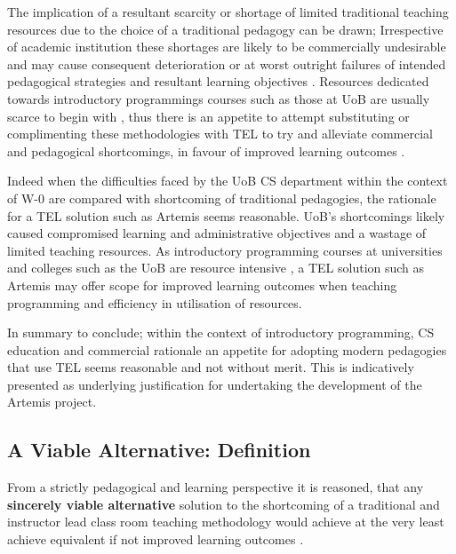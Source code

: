 The implication of a resultant scarcity or shortage  of limited traditional teaching resources due to the choice of a traditional pedagogy can be drawn; Irrespective of academic institution these shortages are likely to be commercially undesirable and may cause consequent deterioration or at worst outright failures of intended pedagogical strategies and resultant learning objectives \cite{Gordon2014,CinYeeHoo,Stuart2014}. Resources dedicated towards introductory programmings courses such as those at UoB are usually scarce to begin with \cite{Chigona2008}, thus there is an appetite to attempt substituting or complimenting these methodologies with TEL to try and alleviate commercial and pedagogical shortcomings, in favour of improved learning outcomes \cite{Chigona2008,Hackelbusch2007,Serrano-Laguna2015,Bittencourt2015,RickReis,Chat2014}.

Indeed when the difficulties faced by the UoB CS department within the context of W-0 are compared with shortcoming of traditional pedagogies, the rationale for a TEL solution such as Artemis seems reasonable. UoB's shortcomings likely caused compromised learning and administrative objectives and a wastage of limited teaching resources. As introductory programming courses at universities and colleges such as the UoB are resource intensive \cite{Chigona2008}, a TEL solution such as Artemis may offer scope for improved learning outcomes when teaching programming \cite{Ibanez2014,Bittencourt2015,Serrano-Laguna2015} and efficiency in utilisation of resources.

In summary to conclude; within the context of introductory programming, CS education and commercial rationale  an appetite for adopting modern pedagogies that use TEL seems reasonable and not without merit. This is indicatively presented as underlying justification for undertaking the development of the Artemis project.


\label{sec:sec01}
\subsection{A Viable Alternative: Definition}
\label{subsec:subsec01}

From a strictly pedagogical and learning perspective it is reasoned, that any \textbf{sincerely viable alternative} solution to the shortcoming of a traditional and instructor lead class room teaching methodology would achieve at the very least achieve equivalent if not improved learning outcomes \cite{RickReis,Means2009}. 

